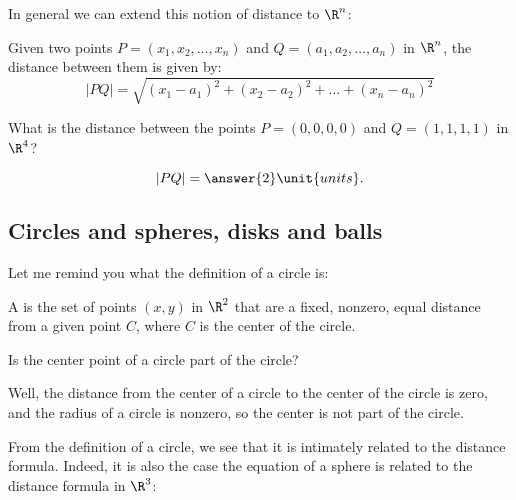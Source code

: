 \documentclass{ximera}
\begin{document}
In general we can extend this notion of distance to $\R^n$:

\begin{theorem}
  Given two points $P=(x_1,x_2,\dots,x_n)$ and $Q=(a_1,a_2,\dots,a_n)$
  in $\R^n$, the distance between them is given by:
  \[
  |PQ|=\sqrt{(x_1-a_1)^2 + (x_2-a_2)^2 + \dots + (x_n-a_n)^2}
  \]
\end{theorem}

\begin{question}
  What is the distance between the points $P=(0,0,0,0)$ and $Q=(1,1,1,1)$ in $\R^4$?
  \begin{prompt}
    \[
    |PQ|=\answer{2}\unit{units}.
    \]
  \end{prompt}
\end{question}





\subsection{Circles and spheres, disks and balls}

Let me remind you what the definition of a circle is:
\begin{definition}
  A  is the set of points $(x,y)$ in $\R^2$ that are a
  fixed, nonzero, equal distance from a given point $C$, where $C$ is
  the center of the circle.
\end{definition}

\begin{question}
  Is the center point of a circle part of the circle?
  \begin{prompt}
    \begin{multipleChoice}
    \end{multipleChoice}
    \begin{feedback}
      Well, the distance from the center of a circle to the center of
      the circle is zero, and the radius of a circle is nonzero, so
      the center is not part of the circle.
    \end{feedback}
  \end{prompt}
\end{question}

From the definition of a circle, we see that it is intimately related
to the distance formula. Indeed, it is also the case the equation of a
sphere is related to the distance formula in $\R^3$:
\end{document}
